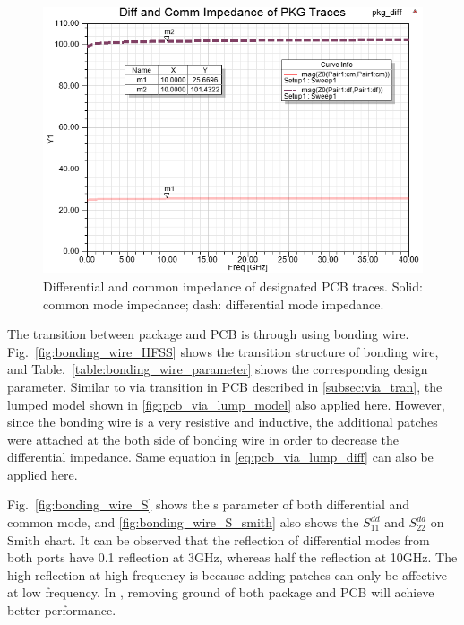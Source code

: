 \documentclass{book}  %
\renewcommand{\subsection}[1]{\psubsection{#1}}
\begin{document}
\begin{paper}
\begin{figure}[htbp!]
	\centering
	\includegraphics[width=0.8\columnwidth]{./img/PCB/differential_PKG_2D_impedance.png}
	\caption{Differential and common impedance of designated PCB traces. Solid: common mode impedance; dash: differential mode impedance.}
	\label{fig:pkg_trace_impedance} %
\end{figure}



\subsection{Bonding Wire Transition}
\label{sec:bond_wire}
The transition between package and PCB is through using bonding wire. Fig.~\ref{fig:bonding_wire_HFSS} shows the transition structure of bonding wire, and Table.~\ref{table:bonding_wire_parameter} shows the corresponding design parameter. Similar to via transition in PCB described in \ref{subsec:via_tran}, the lumped model shown in \ref{fig:pcb_via_lump_model} also applied here. However, since the bonding wire is a very resistive and inductive, the additional patches were attached at the both side of bonding wire in order to decrease the differential impedance. Same equation in \ref{eq:pcb_via_lump_diff} can also be applied here. 

Fig.~\ref{fig:bonding_wire_S} shows the s parameter of both differential and common mode, and \ref{fig:bonding_wire_S_smith} also shows the $S^{dd}_{11}$ and $S^{dd}_{22}$ on Smith chart. It can be observed that the reflection of differential modes from both ports have 0.1 reflection at 3GHz, whereas half the reflection at 10GHz. The high reflection at high frequency is because adding patches can only be affective at low frequency. In \cite{1IWSPI2S2_FikarS_ScholtzAL_2008_100ghz_bandwidth}, removing ground of both package and PCB will achieve better performance. 


\end{paper}
\end{document}
